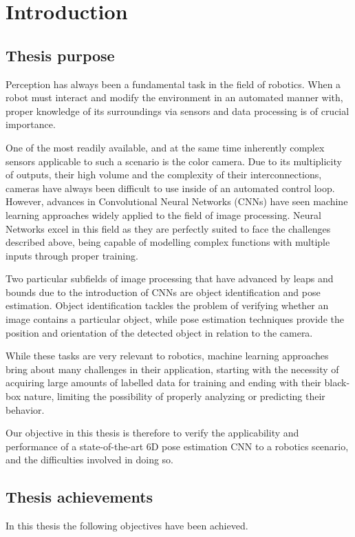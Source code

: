 \chapter{Introduction}

\section{Thesis purpose}

Perception has always been a fundamental task in the field of robotics. When a robot must interact and modify the environment in an automated manner with, proper knowledge of its surroundings via sensors and data processing is of crucial importance.

One of the most readily available, and at the same time inherently complex sensors applicable to such a scenario is the color camera. Due to its multiplicity of outputs, their high volume and the complexity of their interconnections, cameras have always been difficult to use inside of an automated control loop. However, advances in Convolutional Neural Networks (CNNs) have seen machine learning approaches widely applied to the field of image processing. Neural Networks excel in this field as they are perfectly suited to face the challenges described above, being capable of modelling complex functions with multiple inputs through proper training.

Two particular subfields of image processing that have advanced by leaps and bounds due to the introduction of CNNs are object identification and pose estimation. Object identification tackles the problem of verifying whether an image contains a particular object, while pose estimation techniques provide the position and orientation of the detected object in relation to the camera.

While these tasks are very relevant to robotics, machine learning approaches bring about many challenges in their application, starting with the necessity of acquiring large amounts of labelled data for training and ending with their black-box nature, limiting the possibility of properly analyzing or predicting their behavior.

Our objective in this thesis is therefore to verify the applicability and performance of a state-of-the-art 6D pose estimation CNN to a robotics scenario, and the difficulties involved in doing so.

\section{Thesis achievements}
In this thesis the following objectives have been achieved.

